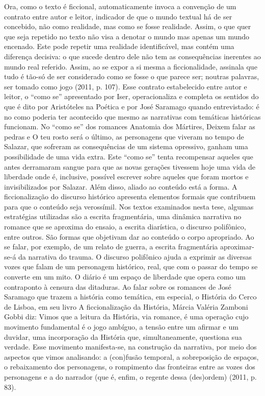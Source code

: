 \documentclass[../DISSERTACAO_MAIN.tex]{subfiles}
\begin{document}
Ora, como o texto é ficcional, automaticamente invoca a convenção de um contrato entre autor e leitor, indicador de que o mundo textual há de ser concebido, não como realidade, mas como se fosse realidade. Assim, o que quer que seja repetido no texto não visa a denotar o mundo mas apenas um mundo encenado. Este pode repetir uma realidade identificável, mas contém uma diferença decisiva: o que sucede dentro dele não tem as consequências inerentes ao mundo real referido. Assim, ao se expor a si mesma a ficcionalidade, assinala que tudo é tão-só de ser considerado como se fosse o que parece ser; noutras palavras, ser tomado como jogo (2011, p. 107).
Esse contrato estabelecido entre autor e leitor, o “como se” apresentado por Iser, operacionaliza e completa os sentidos do que é dito por Aristóteles na Poética e por José Saramago quando entrevistado: é no como poderia ter acontecido que mesmo as narrativas com temáticas históricas funcionam. No “como se” dos romances Anatomia dos Mártires, Deixem falar as pedras e O teu rosto será o último, as personagens que viveram no tempo de Salazar, que sofreram as consequências de um sistema opressivo, ganham uma possibilidade de uma vida extra. Este “como se” tenta recompensar aqueles que antes derramaram sangue para que as novas gerações tivessem hoje uma vida de liberdade onde é, inclusive, possível escrever sobre aqueles que foram mortos e invisibilizados por Salazar. 
Além disso, aliado ao conteúdo está a forma. A ficcionalização do discurso histórico apresenta elementos formais que contribuem para que o conteúdo seja verossímil. Nos textos examinados nesta tese, algumas estratégias utilizadas são a escrita fragmentária, uma dinâmica narrativa no romance que se aproxima do ensaio, a escrita diarística, o discurso polifônico, entre outros. São formas que objetivam dar ao conteúdo o corpo apropriado. Ao se falar, por exemplo, de um relato de guerra, a escrita fragmentária aproximar-se-á da narrativa do trauma. O discurso polifônico ajuda a exprimir as diversas vozes que falam de um personagem histórico, real, que com o passar do tempo se converte em um mito. O diário é um espaço de liberdade que opera como um contraponto à censura das ditaduras. Ao falar sobre os romances de José Saramago que trazem a história como temática, em especial, o História do Cerco de Lisboa, em seu livro A ficcionalização da História, Márcia Valéria Zamboni Gobbi diz:
Vimos que a leitura da História, via romance, é uma operação cujo movimento fundamental é o jogo ambíguo, a tensão entre um afirmar e um duvidar, uma incorporação da História que, simultaneamente, questiona sua verdade. Esse movimento manifesta-se, na construção da narrativa, por meio dos aspectos que vimos analisando: a (con)fusão temporal, a sobreposição de espaços, o rebaixamento dos personagens, o rompimento das fronteiras entre as vozes dos personagens e a do narrador (que é, enfim, o regente dessa (des)ordem) (2011, p. 83).
\end{document}
